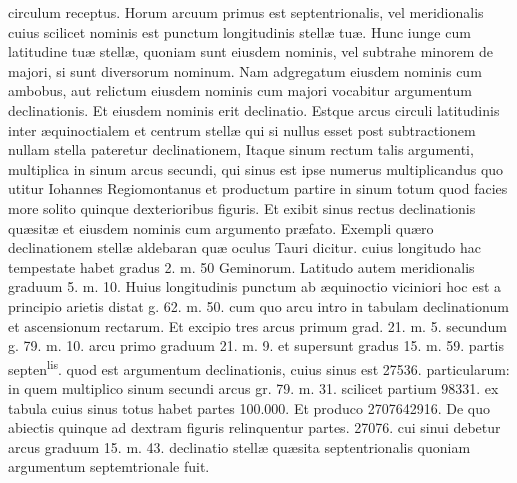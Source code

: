 \documentclass[11pt,a4paper]{article}
\begin{document}
circulum receptus. Horum arcuum primus est septentrionalis, vel meridionalis cuius scilicet nominis est punctum longitudinis stellæ tuæ. Hunc iunge cum latitudine tuæ stellæ, quoniam sunt eiusdem nominis, vel subtrahe minorem de majori, si sunt diversorum nominum. Nam adgregatum eiusdem nominis  cum ambobus, aut relictum eiusdem nominis cum majori vocabitur argumentum declinationis. Et eiusdem nominis erit declinatio. Estque arcus circuli latitudinis inter æquinoctialem et centrum stellæ qui si nullus esset post subtractionem nullam stella pateretur declinationem, Itaque sinum rectum talis argumenti, multiplica in sinum arcus secundi, qui sinus est ipse numerus multiplicandus quo utitur Iohannes Regiomontanus et productum partire in sinum totum quod facies more solito quinque dexterioribus figuris. Et exibit sinus rectus declinationis quæsitæ et eiusdem nominis cum argumento præfato. Exempli  quæro declinationem stellæ aldebaran quæ oculus Tauri dicitur. cuius longitudo hac tempestate habet gradus 2. m. 50 Geminorum. Latitudo autem meridionalis graduum 5. m. 10. Huius longitudinis punctum ab æquinoctio viciniori hoc est a principio arietis distat g. 62. m. 50. cum quo arcu intro in tabulam declinationum et ascensionum rectarum. Et excipio tres arcus primum grad. 21. m. 5. secundum g. 79. m. 10.  arcu primo graduum 21. m. 9. et supersunt gradus 15. m. 59. partis septen\textsuperscript{lis}. quod est argumentum declinationis, cuius sinus est 27536. particularum: in quem multiplico sinum secundi arcus gr. 79. m. 31. scilicet partium 98331. ex tabula cuius sinus totus habet partes 100.000. Et produco 2707642916. De quo abiectis quinque ad dextram figuris relinquentur partes. 27076. cui sinui debetur arcus graduum 15. m. 43. declinatio stellæ quæsita septentrionalis quoniam argumentum septemtrionale fuit.
\end{document}
